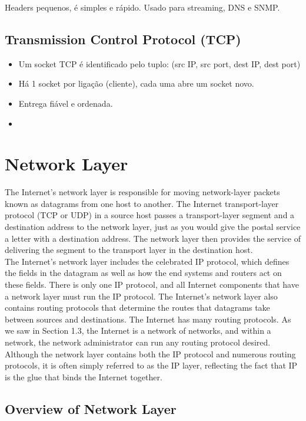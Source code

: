 \documentclass[12pt]{article}
\begin{document}
Headers pequenos, é simples e rápido. Usado para streaming, DNS e SNMP.

\subsection{Transmission Control Protocol (TCP)}

\begin{itemize}
    \item Um socket TCP é identificado pelo tuplo: (src IP, src port, dest IP, dest port)
    \item Há 1 socket por ligação (cliente), cada uma abre um socket novo.
    \item Entrega fiável e ordenada.
    \item 
\end{itemize}

\newpage

\section{Network Layer}

The Internet's network layer is responsible for moving network-layer packets known as datagrams from one host to another. The Internet transport-layer protocol (TCP or UDP) in a source host passes a transport-layer segment and a destination address to the network layer, just as you would give the postal service a letter with a destination address. The network layer then provides the service of delivering the segment to the transport layer in the destination host. 
\vspace{0.5cm} \\
The Internet's network layer includes the celebrated IP protocol, which defines the fields in the datagram as well as how the end systems and routers act on these fields. There is only one IP protocol, and all Internet components that have a network layer must run the IP protocol. The Internet's network layer also contains routing protocols that determine the routes that datagrams take between sources and destinations. The Internet has many routing protocols. As we saw in Section 1.3, the Internet is a network of networks, and within a network, the network administrator can run any routing protocol desired. Although the network layer contains both the IP protocol and numerous routing protocols, it is often simply referred to as the IP layer, reflecting the fact that IP is the glue that binds the Internet together.

\subsection{Overview of Network Layer}
\end{document}
